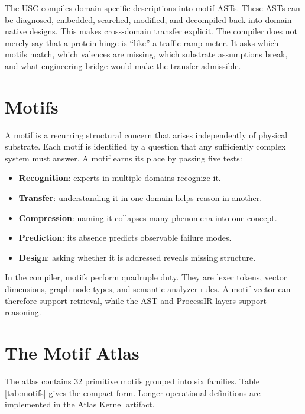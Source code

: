 \documentclass[11pt]{article}
\begin{document}
The USC compiles domain-specific descriptions into motif ASTs. These ASTs can
be diagnosed, embedded, searched, modified, and decompiled back into
domain-native designs. This makes cross-domain transfer explicit. The compiler
does not merely say that a protein hinge is ``like'' a traffic ramp meter. It
asks which motifs match, which valences are missing, which substrate
assumptions break, and what engineering bridge would make the transfer
admissible.

\section{Motifs}

A motif is a recurring structural concern that arises independently of physical
substrate. Each motif is identified by a question that any sufficiently complex
system must answer. A motif earns its place by passing five tests:

\begin{itemize}
  \item \textbf{Recognition}: experts in multiple domains recognize it.
  \item \textbf{Transfer}: understanding it in one domain helps reason in another.
  \item \textbf{Compression}: naming it collapses many phenomena into one concept.
  \item \textbf{Prediction}: its absence predicts observable failure modes.
  \item \textbf{Design}: asking whether it is addressed reveals missing structure.
\end{itemize}

In the compiler, motifs perform quadruple duty. They are lexer tokens, vector
dimensions, graph node types, and semantic analyzer rules. A motif vector can
therefore support retrieval, while the AST and ProcessIR layers support
reasoning.

\section{The Motif Atlas}

The atlas contains 32 primitive motifs grouped into six families. Table
\ref{tab:motifs} gives the compact form. Longer operational definitions are
implemented in the Atlas Kernel artifact.
\end{document}

